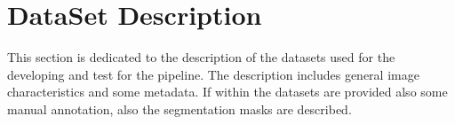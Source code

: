 \documentclass{standalone}
\begin{document}
	\section{DataSet Description}
	
	This section is dedicated to the description of the datasets used for the developing and test for the pipeline. The description includes general image characteristics and some metadata. If within the datasets are provided also some manual annotation, also the segmentation masks are described.
\end{document}
